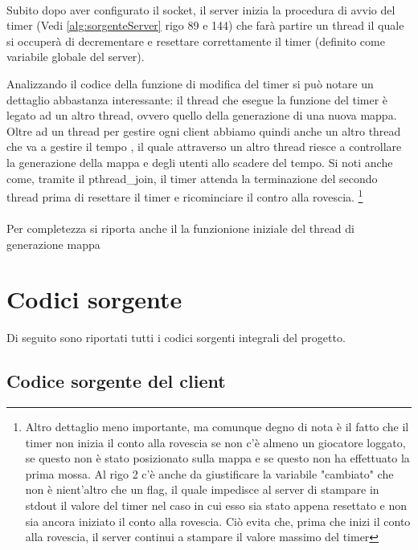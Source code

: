 \documentclass[a4paper]{article}
\begin{document}
\paragraph{}
Subito dopo aver configurato il socket, il server inizia la procedura di avvio del timer (Vedi \autoref{alg:sorgenteServer} rigo 89 e 144) che farà partire un thread il quale si occuperà
di decrementare e resettare correttamente il timer (definito come variabile globale del server).

Analizzando il codice della funzione di modifica del timer si può notare un dettaglio abbastanza interessante: 
il thread che esegue la funzione del timer è legato ad un altro thread, ovvero quello della generazione di una nuova mappa.
Oltre ad un thread per gestire ogni client abbiamo quindi anche un altro thread che va a gestire il tempo ,
il quale attraverso un altro thread riesce a controllare la generazione della mappa e degli utenti allo scadere del tempo.
Si noti anche come, tramite il pthread\_join, il timer attenda la terminazione del secondo thread prima di resettare il timer e ricominciare il contro alla rovescia.
\footnote{Altro dettaglio meno importante, ma comunque degno di nota è il fatto che il timer non inizia il conto alla rovescia
se non c'è almeno un giocatore loggato, se questo non è stato posizionato sulla mappa e se questo non ha effettuato la prima mossa.
Al rigo 2 c'è anche da giustificare la variabile "cambiato" che non è nient'altro che un flag, il quale impedisce al server di stampare in stdout il valore del timer nel caso in cui esso sia stato appena resettato e non sia ancora iniziato il conto alla rovescia. Ciò evita che, prima che inizi il conto alla rovescia, il server continui a stampare il valore massimo del timer }
\paragraph{}
Per completezza si riporta anche il la funzionione iniziale del thread di generazione mappa

\pagebreak

\appendix
\section{Codici sorgente}
Di seguito sono riportati tutti i codici sorgenti integrali del progetto.
\subsection{Codice sorgente del client}

\end{document}
